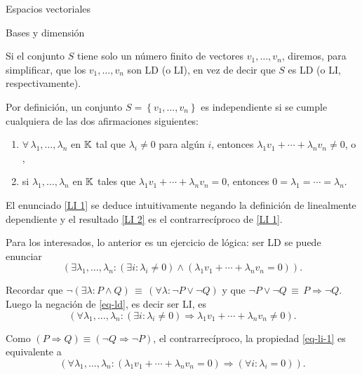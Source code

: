 \begin{chapter}{Espacios vectoriales}
\begin{section}{Bases y dimensi\'on}
\begin{definicion}
        Si el conjunto $S$ tiene solo un número finito de vectores $v_1,\ldots,v_n$, diremos, para simplificar, que los $v_1,\ldots,v_n$ son LD (o LI), en vez de decir
        que $S$ es LD (o LI, respectivamente).
        
    \end{definicion}

 Por definición, un conjunto $S = \left\{v_1,\ldots,v_n \right\}$ es independiente si se cumple cualquiera de las dos afirmaciones siguientes:
	
 \begin{enumerate}[label=(LI $\arabic*$), ref=(LI $\arabic*$)]
		\item\label{LI 1} $\forall\,\lambda_1,\ldots,\lambda_n$ en $\mathbb K$ tal que $\lambda_i \ne 0$ para algún $i$,  entonces  $\lambda_1v_1+\cdots+\lambda_nv_n\not=0$, o , 
		\item\label{LI 2} si $\lambda_1,\ldots,\lambda_n$ en $\mathbb K$ tales que $\lambda_1v_1+\cdots+\lambda_nv_n=0$,  entonces $0=\lambda_1=\cdots=\lambda_n$.
	\end{enumerate}


    El enunciado \ref{LI 1} se deduce intuitivamente negando  la definición de linealmente dependiente y el resultado \ref{LI 2} es el contrarrecíproco  de \ref{LI 1}.
    
\begin{observacion*}
Para los interesados, lo anterior es un ejercicio de lógica: ser LD se puede enunciar 
\begin{equation*}\label{eq-ld}
    (\exists \lambda_1,\ldots,\lambda_n: (\exists i: \lambda_i \ne 0) \wedge (\lambda_1v_1+\cdots+\lambda_nv_n=0 )).
\tag{LD}
\end{equation*}

Recordar que $\neg(\exists \lambda: P \wedge Q) \,\equiv\, (\forall \lambda: \neg P \vee \neg Q)$ y  que  $\neg P \vee \neg Q\,\equiv\, P \Rightarrow \neg Q$. Luego  la negación de \eqref{eq-ld}, es decir ser LI, es 
\begin{equation*}\label{eq-li-1}
    (\forall \lambda_1,\ldots,\lambda_n:  (\exists i: \lambda_i \ne 0) \Rightarrow \lambda_1v_1+\cdots+\lambda_nv_n\ne 0). \tag{LI $1$}
\end{equation*}

Como $(P \Rightarrow Q) \equiv (\neg Q \Rightarrow \neg P)$, el contrarrecíproco, la propiedad \eqref{eq-li-1}  es equivalente a
\begin{equation*}
(\forall \lambda_1,\ldots,\lambda_n:  (\lambda_1v_1+\cdots+\lambda_nv_n=0 ) \Rightarrow (\forall i: \lambda_i = 0)). \tag{LI $2$}
\end{equation*}
    

\end{observacion*}
\end{section}
\end{chapter}
